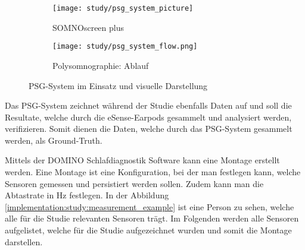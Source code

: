 \begin{figure}[ht]
    \centering
    \begin{subfigure}{.4\textwidth}
        \begin{center}
            \texttt{[image: study/psg\_system\_picture]}
        \end{center}
        \caption{{SOMNOscreen \texttrademark} plus}
    \end{subfigure}
    \begin{subfigure}{.58\textwidth}
        \begin{center}
            \texttt{[image: study/psg\_system\_flow.png]}
        \end{center}
        \caption{Polysomnographie: Ablauf}
    \end{subfigure}
    \caption{PSG-System im Einsatz und visuelle Darstellung \cite{SomnomedicsSomnoscreenBroschure}}
    \label{analysis:psg:picture}
\end{figure}



Das PSG-System zeichnet während der Studie ebenfalls Daten auf und soll die Resultate, welche durch die eSense-Earpods gesammelt und analysiert werden, verifizieren. Somit dienen die Daten, welche durch das PSG-System gesammelt werden, als \glqq Ground-Truth\grqq.

Mittels der {\glqq DOMINO Schlafdiagnostik\grqq} Software kann eine Montage erstellt werden. 
Eine Montage ist eine Konfiguration, bei der man festlegen kann, welche Sensoren gemessen und persistiert werden sollen. Zudem kann man die Abtastrate in $\si{\hertz}$ festlegen.
In der Abbildung \ref{implementation:study:measurement_example} ist eine Person zu sehen, welche alle für die Studie relevanten Sensoren trägt.
Im Folgenden werden alle Sensoren aufgelistet, welche für die Studie aufgezeichnet wurden und somit die Montage darstellen.

